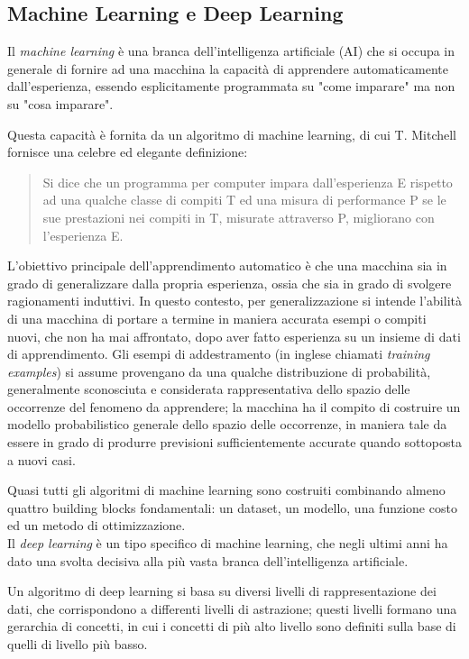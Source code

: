 \subsection{Machine Learning e Deep Learning}
Il \textit{machine learning} è una branca dell'intelligenza artificiale (AI) che si occupa in generale di fornire ad una macchina la capacità di apprendere automaticamente dall'esperienza, essendo esplicitamente programmata su "come imparare" ma non su "cosa imparare".

Questa capacità è fornita da un algoritmo di machine learning, di cui T. Mitchell fornisce una celebre ed elegante definizione:
\begin{quote}
Si dice che un programma per computer impara dall’esperienza E rispetto ad una qualche classe di compiti T ed una misura di performance P se le sue prestazioni nei compiti in T, misurate attraverso P, migliorano con l’esperienza E.
\end{quote}

L'obiettivo principale dell'apprendimento automatico è che una macchina sia in grado di generalizzare dalla propria esperienza\cite{bishop}, ossia che sia in grado di svolgere ragionamenti induttivi. In questo contesto, per generalizzazione si intende l'abilità di una macchina di portare a termine in maniera accurata esempi o compiti nuovi, che non ha mai affrontato, dopo aver fatto esperienza su un insieme di dati di apprendimento.
Gli esempi di addestramento (in inglese chiamati \textit{training examples}) si assume provengano da una qualche distribuzione di probabilità, generalmente sconosciuta e considerata rappresentativa dello spazio delle occorrenze del fenomeno da apprendere; la macchina ha il compito di costruire un modello probabilistico generale dello spazio delle occorrenze, in maniera tale da essere in grado di produrre previsioni sufficientemente accurate quando sottoposta a nuovi casi.

Quasi tutti gli algoritmi di machine learning sono costruiti combinando almeno quattro
building blocks fondamentali: un dataset, un modello, una funzione costo ed un
metodo di ottimizzazione.\\

Il \textit{deep learning} è un tipo specifico di machine learning, che negli ultimi anni ha dato una svolta decisiva alla più vasta branca dell’intelligenza artificiale.

Un algoritmo di deep learning si basa su diversi livelli di rappresentazione dei dati, che corrispondono a differenti livelli di astrazione; questi livelli formano una gerarchia di concetti, in cui i concetti di più alto livello sono definiti sulla base di quelli di livello più basso.

